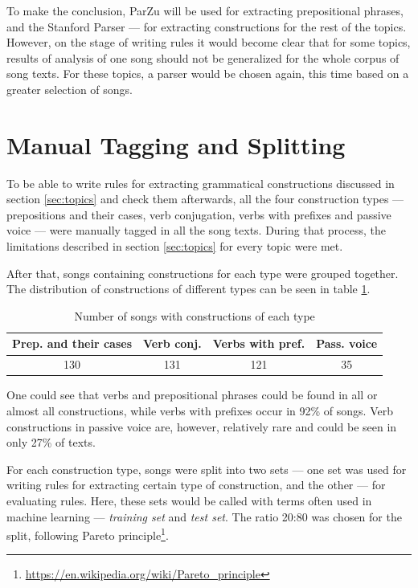 To make the conclusion, ParZu will be used for extracting prepositional phrases, and the Stanford Parser --- for extracting constructions for the rest of the topics. However, on the stage of writing rules it would become clear that for some topics, results of analysis of one song should not be generalized for the whole corpus of song texts. For these topics, a parser would be chosen again, this time based on a greater selection of songs.

\section{Manual Tagging and Splitting}

To be able to write rules for extracting grammatical constructions discussed in section \ref{sec:topics} and check them afterwards, all the four construction types --- prepositions and their cases, verb conjugation, verbs with prefixes and passive voice --- were manually tagged in all the song texts. During that process, the limitations described in section \ref{sec:topics} for every topic were met.

After that, songs containing constructions for each type were grouped together. The distribution of constructions of different types can be seen in table \ref{table:songs-to-types}.

\begin{table}[h!]
\centering
    \begin{tabular}{c|c|c|c}
        Prep. and their cases  & Verb conj. & Verbs with pref. & Pass. voice \\
        \hline
        130 & 131 & 121 & 35 \\
        \hline
    \end{tabular}
    \caption{Number of songs with constructions of each type}
    \label{table:songs-to-types}
\end{table}

One could see that verbs and prepositional phrases could be found in all or almost all constructions, while verbs with prefixes occur in 92\% of songs. Verb constructions in passive voice are, however, relatively rare and could be seen in only 27\% of texts.

For each construction type, songs were split into two sets --- one set was used for writing rules for extracting certain type of construction, and the other --- for evaluating rules. Here, these sets would be called with terms often used in machine learning --- \textit{training set} and \textit{test set}. The ratio 20:80 was chosen for the split, following Pareto principle\footnote{\url{https://en.wikipedia.org/wiki/Pareto_principle}}.

